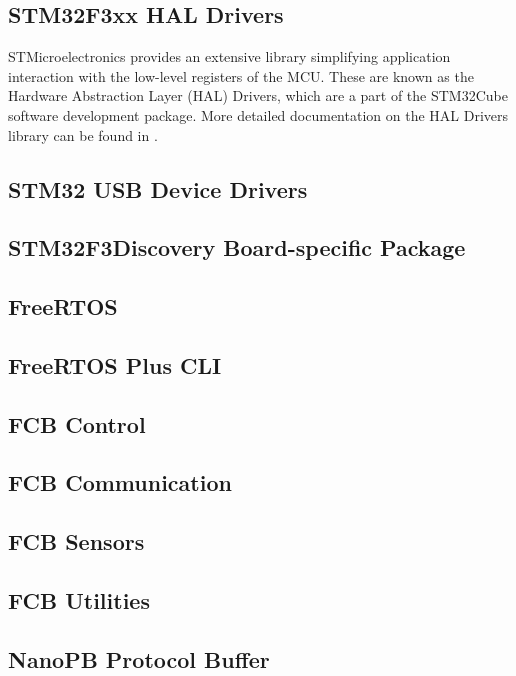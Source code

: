 \documentclass[a4paper]{report}
\begin{document}
		\subsection{STM32F3xx HAL Drivers}
STMicroelectronics provides an extensive library simplifying application interaction with the low-level registers of the MCU. These are known as the Hardware Abstraction Layer (HAL) Drivers, which are a part of the STM32Cube software development package. More detailed documentation on the HAL Drivers library can be found in \cite{stm32f3haldrivers}.

		\subsection{STM32 USB Device Drivers}

		\subsection{STM32F3Discovery Board-specific Package}

		\subsection{FreeRTOS}

		\subsection{FreeRTOS Plus CLI}

		\subsection{FCB Control}

		\subsection{FCB Communication}

		\subsection{FCB Sensors}

		\subsection{FCB Utilities}

		\subsection{NanoPB Protocol Buffer}
\end{document}
